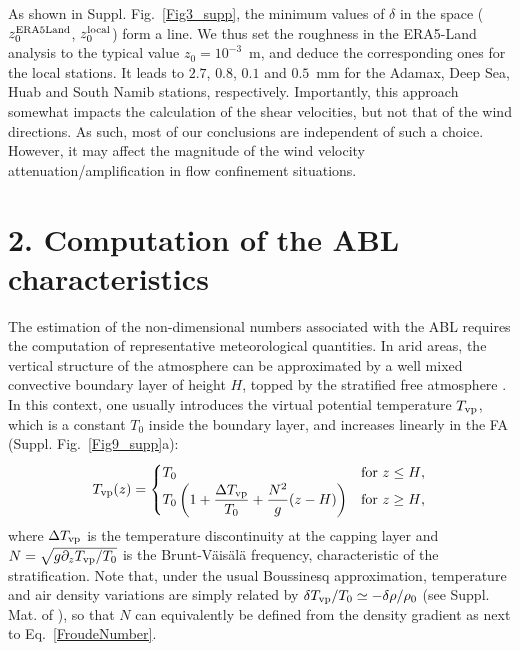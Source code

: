 As shown in Suppl. Fig.~\ref{Fig3_supp}, the minimum values of $\delta$ in the space ($z_{0}^{\textup{ERA5Land}}$, $z_{0}^{\textup{local}}$) form a line. We thus set the roughness in the ERA5-Land analysis to the typical value $z_0=10^{-3}$~m, and deduce the corresponding ones for the local stations. It leads to $2.7$, $0.8$, $0.1$ and $0.5$~mm for the Adamax, Deep Sea, Huab and South Namib stations, respectively. Importantly, this approach somewhat impacts the calculation of the shear velocities, but not that of the wind directions. As such, most of our conclusions are independent of such a choice. However, it may affect the magnitude of the wind velocity attenuation/amplification in flow confinement situations.


\section*{2. Computation of the ABL characteristics}

The estimation of the non-dimensional numbers associated with the ABL requires the computation of representative meteorological quantities. In arid areas, the vertical structure of the atmosphere can be approximated by a well mixed convective boundary layer of height $H$, topped by the stratified free atmosphere \citep{Stull1988, Shao2008}. In this context, one usually introduces the virtual potential temperature $T_{\textup{vp}}$, which is a constant $T_{0}$ inside the boundary layer, and increases linearly in the FA (Suppl. Fig.~\ref{Fig9_supp}a):
%
\begin{equation}
T_{\textup{vp}}(z) =
\begin{cases}
T_{0} &\text{for $z \leq H$},\\
T_{0}\left(1 + \displaystyle\frac{\Delta T_{\textup{vp}}}{T_{0}} + \frac{N^{2}}{g}(z - H)\right) &\text{for $ z \geq H$},
\end{cases}
\label{TvpVerticalProfile}
\end{equation}
%
where $\Delta T_{\textup{vp}}$ is the temperature discontinuity at the capping layer and $N = \sqrt{g \partial_z T_{\textup{vp}} / T_{0}}$ is the Brunt-V\"ais\"al\"a frequency, characteristic of the stratification. Note that, under the usual Boussinesq approximation, temperature and air density variations are simply related by $\delta T_{\textup{vp}}/T_{0} \simeq - \delta\rho/\rho_{0}$ (see Suppl. Mat. of \citet{andreotti2009}), so that $N$ can equivalently be defined from the density gradient as next to Eq.~\ref{FroudeNumber}.

